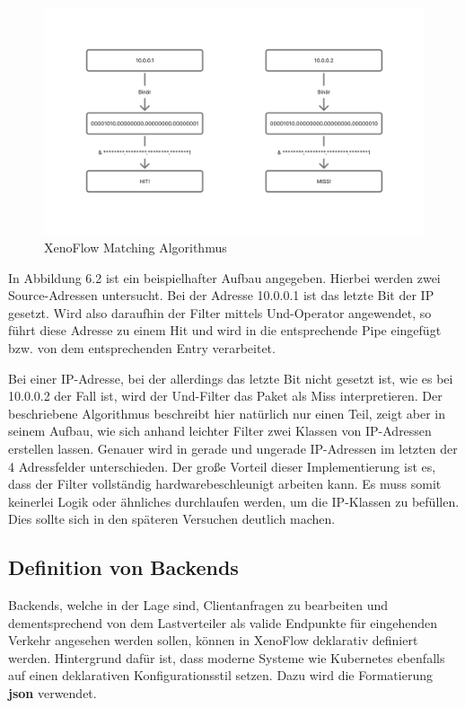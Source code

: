 \begin{figure}
    \centering
    \includegraphics[width=1.1\linewidth]{images/Filter Matching.png}
    \caption{XenoFlow Matching Algorithmus}
    \label{fig:enter-label}
\end{figure}
In Abbildung 6.2 ist ein beispielhafter Aufbau angegeben. Hierbei werden zwei Source-Adressen untersucht. Bei der Adresse 10.0.0.1 ist das letzte Bit der IP gesetzt. Wird also daraufhin der Filter mittels Und-Operator angewendet, so führt diese Adresse zu einem Hit und wird in die entsprechende Pipe eingefügt bzw. von dem entsprechenden Entry verarbeitet. 

Bei einer IP-Adresse, bei der allerdings das letzte Bit nicht gesetzt ist, wie es bei 10.0.0.2 der Fall ist, wird der Und-Filter das Paket als Miss interpretieren. Der beschriebene Algorithmus beschreibt hier natürlich nur einen Teil, zeigt aber in seinem Aufbau, wie sich anhand leichter Filter zwei Klassen von IP-Adressen erstellen lassen. Genauer wird in gerade und ungerade IP-Adressen im letzten der 4 Adressfelder unterschieden. Der große Vorteil dieser Implementierung ist es, dass der Filter vollständig hardwarebeschleunigt arbeiten kann. Es muss somit keinerlei Logik oder ähnliches durchlaufen werden, um die IP-Klassen zu befüllen. Dies sollte sich in den späteren Versuchen deutlich machen.
\subsection{Definition von Backends}
Backends, welche in der Lage sind, Clientanfragen zu bearbeiten und dementsprechend von dem Lastverteiler als valide Endpunkte für eingehenden Verkehr angesehen werden sollen, können in XenoFlow deklarativ definiert werden. Hintergrund dafür ist, dass moderne Systeme wie Kubernetes ebenfalls auf einen deklarativen Konfigurationsstil setzen. Dazu wird die Formatierung \textbf{json} verwendet. 

